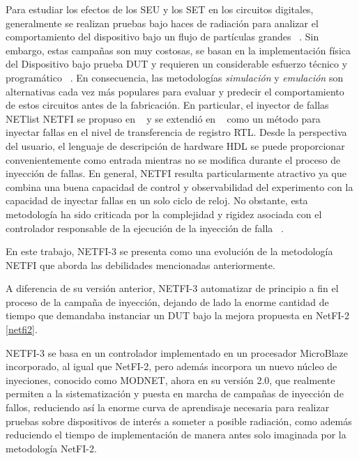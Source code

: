 Para estudiar los efectos de los SEU y los SET en los circuitos digitales, generalmente se realizan pruebas bajo haces de radiación para analizar el comportamiento del dispositivo bajo un flujo de partículas grandes ~\cite{Criswell1984}.
Sin embargo, estas campañas son muy costosas, se basan en la implementación física del Dispositivo bajo prueba DUT y requieren un considerable esfuerzo técnico y programático ~\cite{Velazco2010}.
En consecuencia, las metodologías \emph{simulación} y \emph{emulación} son alternativas cada vez más populares para evaluar y predecir el comportamiento de estos circuitos antes de la fabricación.
En particular, el inyector de fallas NETlist NETFI se propuso en ~\cite{Mansour2013-1} y se extendió en ~\cite{Mansour2013-2} como un método para inyectar fallas en el nivel de transferencia de registro RTL.
Desde la perspectiva del usuario, el lenguaje de descripción de hardware HDL se puede proporcionar convenientemente como entrada mientras no se modifica durante el proceso de inyección de fallas.
En general, NETFI resulta particularmente atractivo ya que combina una buena capacidad de control y observabilidad del experimento con la capacidad de inyectar fallas en un solo ciclo de reloj.
No obstante, esta metodología ha sido criticada por la complejidad y rigidez asociada con el controlador responsable de la ejecución de la inyección de falla ~\cite{Serrano2015}.

En este trabajo, \mbox{NETFI-3} se presenta como una evolución de la metodología NETFI que aborda las debilidades mencionadas anteriormente.

A diferencia de su versión anterior, \mbox{NETFI-3} automatizar de principio a fin el proceso de la campaña de inyección, dejando de lado la enorme cantidad de tiempo que demandaba instanciar un DUT bajo la mejora propuesta en \mbox{NetFI-2} \ref{netfi2}.

\mbox{NETFI-3} se basa en un controlador implementado en un procesador MicroBlaze incorporado, al igual que NetFI-2, pero además incorpora un nuevo núcleo de inyeciones, conocido como MODNET, ahora en su versión 2.0, que realmente permiten a la sistematización y puesta en marcha de campañas de inyección de fallos, reduciendo así la enorme curva de aprendisaje necesaria para realizar pruebas sobre dispositivos de interés a someter a posible radiación, como además reduciendo el tiempo de implementación de manera antes solo imaginada por la metodología NetFI-2.
